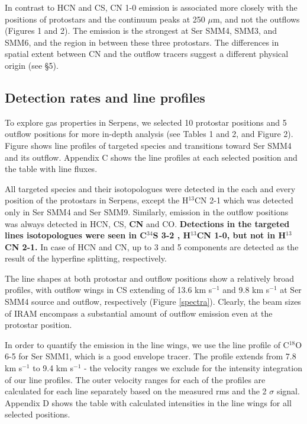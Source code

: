\documentclass{aa}
\begin{document}
In contrast to HCN and CS, CN 1-0 emission is associated more closely with the positions of protostars
and the continuum peaks at 250 $\mu$m, and not the outflows (Figures 1 and 2). The emission is the strongest at
Ser SMM4, SMM3, and SMM6, and the region in between these three protostars. The differences in 
spatial extent between CN and the outflow tracers suggest a different physical origin (see \S 5).

\subsection{Detection rates and line profiles}
To explore gas properties in Serpens, we selected 10 protostar positions and 5 
outflow positions for more in-depth analysis (see Tables 1 and 2, and Figure 2). Figure \label{spectra} shows 
line profiles of targeted species and transitions toward Ser SMM4 and its outflow. Appendix 
C shows the line profiles at each selected position and the table with line fluxes. 

All targeted species and their isotopologues were detected in the each and every position 
of the protostars in Serpens, except the H$^{13}$CN 2-1 which was detected only in Ser SMM4 and Ser SMM9. Similarly, emission in the outflow 
positions was always detected in HCN, CS, \textbf{CN} and CO. \textbf{Detections in the targeted lines isotopologues were seen in C$^{34}$S 3-2 , H$^{13}$CN 1-0, but not in H$^{13}$CN 2-1.}
In case of HCN and CN, up to 3 and 5 components are detected as the result of the hyperfine splitting, respectively. 

The line shapes at both protostar and outflow positions show a relatively broad profiles, 
with outflow wings in CS extending of 13.6 km s$^{-1}$ and 9.8 km s$^{-1}$ at Ser SMM4 
source and outflow, respectively (Figure \ref{spectra}). Clearly, the beam sizes of 
IRAM encompass a substantial amount of outflow emission even at the protostar position. 

In order to quantify the emission in the line wings, we use the line profile of C$^{18}$O 6-5
for Ser SMM1, which is a good envelope tracer. The profile extends from 
7.8 km s$^{-1}$ to 9.4 km s$^{-1}$ - the velocity ranges we exclude for the intensity integration of our line profiles. The outer velocity ranges for each of the profiles are calculated 
for each line separately based on the measured rms and the 2 $\sigma$ signal. Appendix D 
shows the table with calculated intensities in the line wings for all selected positions.
\end{document}
